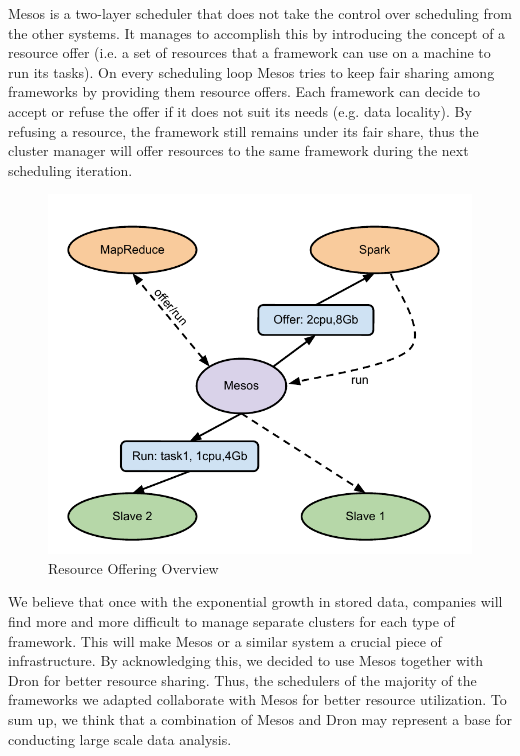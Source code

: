 \documentclass[11pt,a4paper,twoside]{report}
\begin{document}
Mesos is a two-layer scheduler that does not take the control over scheduling from the other systems. It manages to accomplish this by introducing the concept of a resource offer (i.e. a set of resources that a framework can use on a machine to run its tasks). On every scheduling loop Mesos tries to keep fair sharing among frameworks by providing them resource offers. Each framework can decide to accept or refuse the offer if it does not suit its needs (e.g. data locality). By refusing a resource, the framework still remains under its fair share, thus the cluster manager will offer resources to the same framework during the next scheduling iteration.

\begin{figure}[h]
\centering
\includegraphics[scale=0.73]{Mesos}
\caption{Resource Offering Overview}
\label{fig:Mesos}
\end{figure}

We believe that once with the exponential growth in stored data, companies will find more and more difficult to manage separate clusters for each type of framework. This will make Mesos or a similar system a crucial piece of infrastructure. By acknowledging this, we decided to use Mesos together with Dron for better resource sharing. Thus, the schedulers of the majority of the frameworks we adapted collaborate with Mesos for better resource utilization. To sum up, we think that a combination of Mesos and Dron may represent a base for conducting large scale data analysis.
\end{document}
